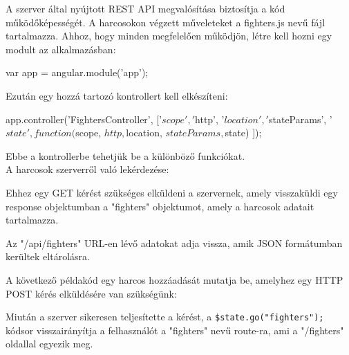 

A szerver által nyújtott REST API megvalósítása biztosítja a kód működőképességét. A harcosokon végzett műveleteket a fighters.js nevű fájl tartalmazza.
Ahhoz, hogy minden megfelelően működjön, létre kell hozni egy modult az alkalmazásban:

\begin{cpp}
var app = angular.module('app');
\end{cpp}

Ezután egy hozzá tartozó kontrollert kell elkészíteni:

\begin{cpp}
app.controller('FightersController', ['$scope', '$http', '$location', 
'$stateParams',  '$state', function($scope, $http, $location, 
$stateParams, $state){
}]);
\end{cpp}

Ebbe a kontrollerbe tehetjük be a különböző funkciókat. \\A harcosok szerverről való lekérdezése:


Ehhez egy GET kérést szükséges elküldeni a szervernek, amely visszaküldi egy response objektumban a "fighters" objektumot, amely a harcosok adatait tartalmazza.

Az "/api/fighters" URL-en lévő adatokat adja vissza, amik JSON formátumban kerültek eltárolásra.

A következő példakód egy harcos hozzáadását mutatja be, amelyhez egy HTTP POST kérés elküldésére van szükségünk:


Miután a szerver sikeresen teljesítette a kérést, a \texttt{\$state.go("fighters");} kódsor
visszairányítja a felhasználót a "fighters" nevű route-ra, ami a "/fighters" oldallal egyezik meg.

